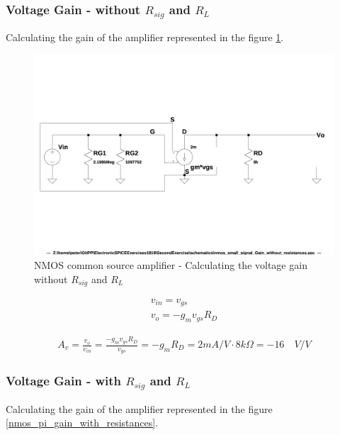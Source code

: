 \documentclass[10pt,a4paper]{book}
\begin{document}
\subsubsection{Voltage Gain - without $R_{sig}$ and $R_L$}\label{AvSec}
Calculating the gain of the amplifier represented in the figure \ref{nmos_pi_gain_without_resistances}.

\begin{figure}[h]
  \centering
  \includegraphics[width=12cm]{schematics/nmos_small_signal_without_resistances.jpg}
  \caption{NMOS common source amplifier - Calculating the voltage gain without $R_{sig}$ and $R_L$}
  \label{nmos_pi_gain_without_resistances}
\end{figure}

\begin{align}
v_{in} = v_{gs}\\
v_{o} = - g_m v_{gs} R_D
\end{align}

\begin{align}
A_v = \frac{v_o}{v_{in}} = \frac{- g_m v_{gs} R_D}{v_{gs}} = - g_m R_D = 2mA/V \cdot 8k\Omega = -16 \quad V/V \label{Av}
\end{align}

\subsubsection{Voltage Gain - with $R_{sig}$ and $R_L$}\label{GvSec}
Calculating the gain of the amplifier represented in the figure \ref{nmos_pi_gain_with_resistances}.
\end{document}
